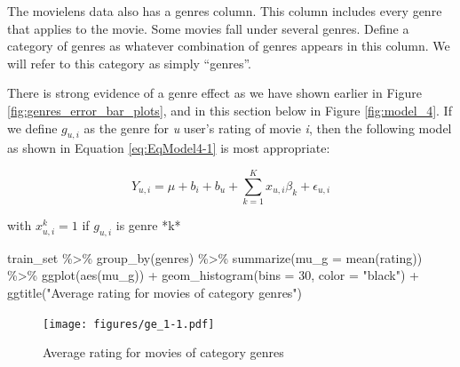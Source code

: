 \documentclass[
]{article}
\newenvironment{Shaded}{}{}
\newcommand{\AttributeTok}[1]{\textcolor[rgb]{0.49,0.56,0.16}{#1}}
\newcommand{\DecValTok}[1]{\textcolor[rgb]{0.25,0.63,0.44}{#1}}
\newcommand{\FunctionTok}[1]{\textcolor[rgb]{0.02,0.16,0.49}{#1}}
\newcommand{\NormalTok}[1]{#1}
\newcommand{\SpecialCharTok}[1]{\textcolor[rgb]{0.25,0.44,0.63}{#1}}
\newcommand{\StringTok}[1]{\textcolor[rgb]{0.25,0.44,0.63}{#1}}
\begin{document}
The movielens data also has a genres column. This column includes every
genre that applies to the movie. Some movies fall under several genres.
Define a category of genres as whatever combination of genres appears in
this column. We will refer to this category as simply ``genres''.

There is strong evidence of a genre effect as we have shown earlier in
Figure \ref{fig:genres_error_bar_plots}, and in this section below in
Figure \ref{fig:model_4}. If we define \(g_{u,i}\) as the genre for
\emph{u} user's rating of movie \emph{i}, then the following model as
shown in Equation \ref{eq:EqModel4-1} is most appropriate:

%
\par

\label{eq:EqModel4-1} \begin{equation}
  Y_{u,i} = \mu + b_{i} + b_{u} + \sum_{k=1}^Kx_{u,i}\beta_k + \epsilon_{u,i}
\end{equation}

\begin{center}
with $x_{u,i}^k=1$ if $g_{u,i}$ is genre *k*
\end{center}

\begin{Shaded}
\begin{Highlighting}[]
\NormalTok{train\_set }\SpecialCharTok{\%\textgreater{}\%} \FunctionTok{group\_by}\NormalTok{(genres) }\SpecialCharTok{\%\textgreater{}\%} \FunctionTok{summarize}\NormalTok{(}\AttributeTok{mu\_g =} \FunctionTok{mean}\NormalTok{(rating)) }\SpecialCharTok{\%\textgreater{}\%} 
    \FunctionTok{ggplot}\NormalTok{(}\FunctionTok{aes}\NormalTok{(mu\_g)) }\SpecialCharTok{+} \FunctionTok{geom\_histogram}\NormalTok{(}\AttributeTok{bins =} \DecValTok{30}\NormalTok{, }\AttributeTok{color =} \StringTok{"black"}\NormalTok{) }\SpecialCharTok{+} 
    \FunctionTok{ggtitle}\NormalTok{(}\StringTok{"Average rating for movies of category genres"}\NormalTok{)}
\end{Highlighting}
\end{Shaded}

\begin{figure}
\centering
\texttt{[image: figures/ge\_1-1.pdf]}
\caption{Average rating for movies of category
genres\label{fig:average_ratings_for_movies_of_category_genres}}
\end{figure}
\end{document}
